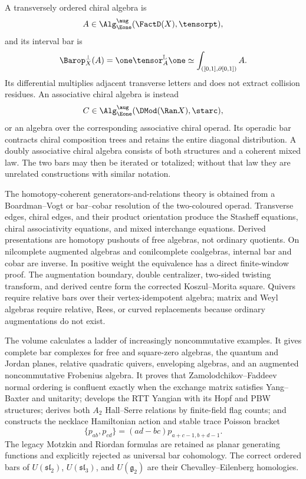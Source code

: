 A transversely ordered chiral algebra is
\[
 A\in \Alg^{\aug}_{\Eone}(\FactD(X),\tensorpt),
\]
and its interval bar is
\[
 \Barop_X^{\perp}(A)=\one\tensor_A^{\mathbb L}\one
 \simeq \int_{([0,1],\partial[0,1])}A.
\]
Its differential multiplies adjacent transverse letters and does not extract collision residues.  An associative chiral algebra is instead
\[
 C\in \Alg^{\aug}_{\Eone}(\DMod(\Ran X),\starc),
\]
or an algebra over the corresponding associative chiral operad.  Its operadic bar contracts chiral composition trees and retains the entire diagonal distribution.  A doubly associative chiral algebra consists of both structures and a coherent mixed law.  The two bars may then be iterated or totalized; without that law they are unrelated constructions with similar notation.

The homotopy-coherent generators-and-relations theory is obtained from a Boardman--Vogt or bar--cobar resolution of the two-coloured operad.  Transverse edges, chiral edges, and their product orientation produce the Stasheff equations, chiral associativity equations, and mixed interchange equations.  Derived presentations are homotopy pushouts of free algebras, not ordinary quotients.  On nilcomplete augmented algebras and conilcomplete coalgebras, internal bar and cobar are inverse.  In positive weight the equivalence has a direct finite-window proof.  The augmentation boundary, double centralizer, two-sided twisting transform, and derived centre form the corrected Koszul--Morita square.  Quivers require relative bars over their vertex-idempotent algebra; matrix and Weyl algebras require relative, Rees, or curved replacements because ordinary augmentations do not exist.

The volume calculates a ladder of increasingly noncommutative examples.  It gives complete bar complexes for free and square-zero algebras, the quantum and Jordan planes, relative quadratic quivers, enveloping algebras, and an augmented noncommutative Frobenius algebra.  It proves that Zamolodchikov--Faddeev normal ordering is confluent exactly when the exchange matrix satisfies Yang--Baxter and unitarity; develops the RTT Yangian with its Hopf and PBW structures; derives both \(A_2\) Hall--Serre relations by finite-field flag counts; and constructs the necklace Hamiltonian action and stable trace Poisson bracket
\[
 \{p_{ab},p_{cd}\}=(ad-bc)p_{a+c-1,b+d-1}.
\]
The legacy Motzkin and Riordan formulas are retained as planar generating functions and explicitly rejected as universal bar cohomology.  The correct ordered bars of \(U(\mathfrak{sl}_2)\), \(U(\mathfrak{sl}_3)\), and \(U(\mathfrak g_2)\) are their Chevalley--Eilenberg homologies.

